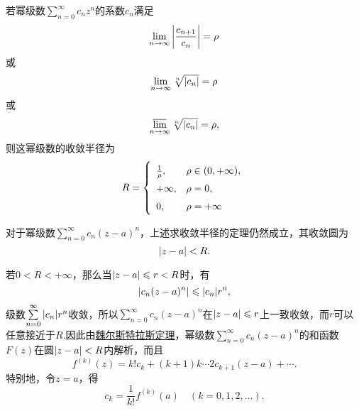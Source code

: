 \begin{theorem}\label{theorem:解析函数的级数表示.复幂级数的收敛半径的求法}
若幂级数\(\sum\limits_{n=0}^{\infty} c_n z^n\)的系数\(c_n\)满足\[
\lim\limits_{n\to\infty} \abs{\frac{c_{n+1}}{c_n}} = \rho
\]或\[
\lim\limits_{n\to\infty} \sqrt[n]{\abs{c_n}} = \rho
\]或\[
\varlimsup\limits_{n\to\infty} \sqrt[n]{\abs{c_n}} = \rho,
\]则这幂级数的收敛半径为\[
\def\arraystretch{1.5}
R = \left\{ \begin{array}{ll}
\frac{1}{\rho}, & \rho \in (0,+\infty), \\
+\infty, & \rho = 0, \\
0, & \rho = +\infty \\
\end{array} \right.
\]
\end{theorem}
对于幂级数\(\sum\limits_{n=0}^{\infty} c_n (z-a)^n\)，上述求收敛半径的定理仍然成立，其收敛圆为\[
\abs{z-a}<R.
\]

若\(0<R<+\infty\)，那么当\(\abs{z-a} \leqslant r < R\)时，有\[
\abs{c_n (z-a)^n} \leqslant \abs{c_n} r^n,
\]级数\(\sum\limits_{n=0}^{\infty} \abs{c_n} r^n\)收敛，所以\(\sum\limits_{n=0}^{\infty} c_n (z-a)^n\)在\(\abs{z-a} \leqslant r\)上一致收敛，而\(r\)可以任意接近于\(R\).因此由\hyperref[theorem:解析函数的级数表示.魏尔斯特拉斯定理]{魏尔斯特拉斯定理}，幂级数\(\sum\limits_{n=0}^{\infty} c_n (z-a)^n\)的和函数\(F(z)\)在圆\(\abs{z-a}<R\)内解析，而且\[
f^{(k)}(z) = k! c_k + (k+1)k\dotsm2c_{k+1}(z-a)+\dotsb.
\]特别地，令\(z=a\)，得\[
c_k = \frac{1}{k!} f^{(k)}(a)
\quad(k=0,1,2,\dotsc).
\]

